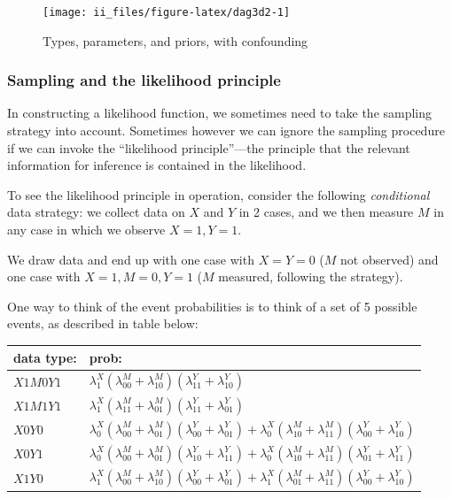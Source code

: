 \documentclass[
  12pt,
]{book}
\begin{document}
\begin{figure}

{\centering \texttt{[image: ii\_files/figure-latex/dag3d2-1]} 

}

\caption{Types, parameters, and priors, with confounding}\label{fig:dag3d2}
\end{figure}

\hypertarget{sampling-and-the-likelihood-principle}{%
\subsubsection{Sampling and the likelihood principle}\label{sampling-and-the-likelihood-principle}}

In constructing a likelihood function, we sometimes need to take the sampling strategy into account. Sometimes however we can ignore the sampling procedure if we can invoke the ``likelihood principle''---the principle that the relevant information for inference is contained in the likelihood.

To see the likelihood principle in operation, consider the following \emph{conditional} data strategy: we collect data on \(X\) and \(Y\) in 2 cases, and we then measure \(M\) in any case in which we observe \(X=1, Y=1\).

We draw data and end up with one case with \(X=Y=0\) (\(M\) not observed) and one case with \(X=1, M=0, Y=1\) (\(M\) measured, following the strategy).

One way to think of the event probabilities is to think of a set of 5 possible events, as described in table below:

\begin{longtable}[]{@{}
  >{\raggedright\arraybackslash}p{}
  >{\raggedright\arraybackslash}p{}@{}}
\toprule
data type: & prob: \\
\midrule
\endhead
\(X1M0Y1\) & \(\lambda^X_1(\lambda^M_{00}+\lambda^M_{10})(\lambda^Y_{11}+\lambda^Y_{10})\) \\
\(X1M1Y1\) & \(\lambda^X_1(\lambda^M_{11}+\lambda^M_{01})(\lambda^Y_{11}+\lambda^Y_{01})\) \\
\(X0Y0\) & \(\lambda^X_0(\lambda^M_{00}+\lambda^M_{01})(\lambda^Y_{00}+\lambda^Y_{01}) + \lambda^X_0(\lambda^M_{10}+\lambda^M_{11})(\lambda^Y_{00}+\lambda^Y_{10})\) \\
\(X0Y1\) & \(\lambda^X_0(\lambda^M_{00}+\lambda^M_{01})(\lambda^Y_{10}+\lambda^Y_{11}) + \lambda^X_0(\lambda^M_{10}+\lambda^M_{11})(\lambda^Y_{01}+\lambda^Y_{11})\) \\
\(X1Y0\) & \(\lambda^X_1(\lambda^M_{00}+\lambda^M_{10})(\lambda^Y_{00}+\lambda^Y_{01}) + \lambda^X_1(\lambda^M_{01}+\lambda^M_{11})(\lambda^Y_{00}+\lambda^Y_{10})\) \\
\bottomrule
\end{longtable}
\end{document}
